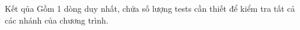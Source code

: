 Kết qủa  
Gồm 1 dòng duy nhất, chứa số lượng tests cần thiết để kiểm tra tất cả các nhánh của chương trình.